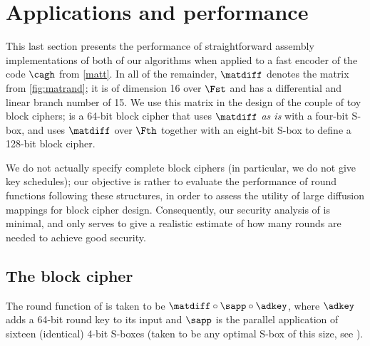 \section{Applications and performance}
\label{sec:appli}

This last section presents the performance of straightforward assembly implementations of both of our
algorithms when applied to a fast encoder of the code $\cagh$ from \autoref{matt}.
In all of the remainder, $\matdiff$ denotes the matrix from \autoref{fig:matrand}; it is
of dimension 16 over $\Fst$ and has a differential and linear branch number of 15.
We use this matrix in the design of the \samneric couple of toy block ciphers; \sam
is a 64-bit block cipher that uses $\matdiff$ \emph{as is} with a four-bit S-box,
and \eric uses $\matdiff$ over $\Fth$ together with an eight-bit S-box to define
a 128-bit block cipher.

We do not actually specify complete block ciphers (in particular, we do not
give key schedules); our objective is rather to evaluate the performance
of round functions following these structures, in order to assess the utility
of large diffusion mappings for block cipher design. Consequently, our security
analysis of \samneric is minimal, and only serves to give a realistic estimate
of how many rounds are needed to achieve good security. 


\subsection{The \sam block cipher}
The round function of \sam is taken to be $\matdiff \circ \sapp \circ \adkey$, where $\adkey$ adds
a 64-bit round key to its input and $\sapp$ is the parallel application of sixteen (identical)
4-bit S-boxes (taken to be any optimal S-box of this size, see \eg \cite{4bit1,class4bit}).

